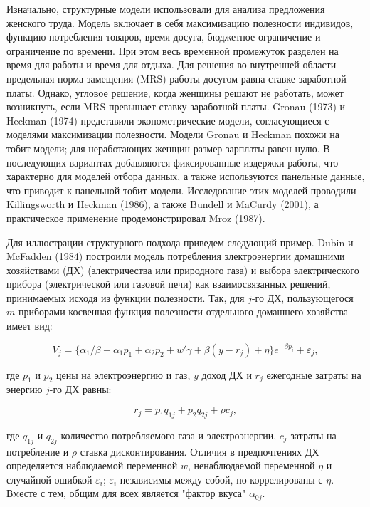Изначально, структурные модели использовали для анализа предложения женского труда. Модель включает в себя максимизацию полезности индивидов, функцию потребления товаров, время досуга, бюджетное ограничение и ограничение по времени. При этом весь временной промежуток разделен на время для работы и время для отдыха. Для решения во внутренней области предельная норма замещения (MRS) работы досугом равна ставке заработной платы. Однако, угловое решение, когда женщины решают не работать, может возникнуть, если MRS превышает ставку заработной платы. Gronau (1973) и Heckman (1974) представили эконометрические модели, согласующиеся с моделями максимизации полезности. Модели Gronau и Heckman похожи на тобит-модели; для неработающих женщин размер зарплаты равен нулю. В последующих вариантах добавляются фиксированные издержки работы, что характерно для моделей отбора данных, а также используются панельные данные, что приводит к панельной тобит-модели. Исследование этих моделей проводили Killingsworth и Heckman (1986), а также Bundell и MaCurdy (2001), а практическое применение продемонстрировал Mroz (1987).


Для иллюстрации структурного подхода приведем следующий пример. Dubin и McFadden (1984) построили модель потребления электроэнергии домашними хозяйствами (ДХ) (электричества или природного газа) и выбора электрического прибора (электрической или газовой печи) как взаимосвязанных решений, принимаемых исходя из функции полезности. Так, для $j$-го ДХ, пользующегося $m$ приборами косвенная функция полезности отдельного домашнего хозяйства имеет вид:

\begin{equation}
V_j=\lbrace\alpha_1/\beta+\alpha_1{p_1}+\alpha_2{p_2}+w'\gamma+\beta(y-r_j)+\eta\rbrace{e}^{-{\beta}p_i}+\varepsilon_j,
\end{equation}

где $p_1$ и $p_2$ цены на электроэнергию и газ, $y$ доход ДХ и $r_j$ ежегодные затраты на энергию $j$-го ДХ равны:

\[
r_j=p_1q_{1j}+p_2q_{2j}+\rho{c}_j,
\]

где $q_{1j}$ и $q_{2j}$ количество потребляемого газа и электроэнергии, $c_j$ затраты на потребление и $\rho$ ставка дисконтирования. Отличия в предпочтениях ДХ определяется наблюдаемой переменной $w$, ненаблюдаемой переменной $\eta$ и случайной ошибкой $\varepsilon_i$; $\varepsilon_i$ независимы между собой, но коррелированы с $\eta$. Вместе с тем, общим для всех является "фактор вкуса" $\alpha_{0j}$.


